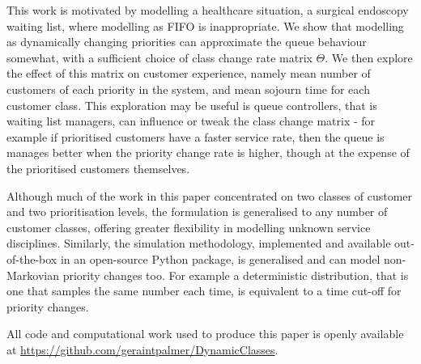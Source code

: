 \documentclass{article}
\begin{document}
This work is motivated by modelling a healthcare situation, a surgical endoscopy
waiting list, where modelling as FIFO is inappropriate. We show that modelling
as dynamically changing priorities can approximate the queue behaviour somewhat,
with a sufficient choice of class change rate matrix $\Theta$. We then explore
the effect of this matrix on customer experience, namely mean number of
customers of each priority in the system, and mean sojourn time for each
customer class. This exploration may be useful is queue controllers, that is
waiting list managers, can influence or tweak the class change matrix - for
example if prioritised customers have a faster service rate, then the queue is
manages better when the priority change rate is higher, though at the expense of
the prioritised customers themselves.

Although much of the work in this paper concentrated on two classes of customer
and two prioritisation levels, the formulation is generalised to any number of
customer classes, offering greater flexibility in modelling unknown service
disciplines. Similarly, the simulation methodology, implemented and available
out-of-the-box in an open-source Python package, is generalised and can model
non-Markovian priority changes too. For example a deterministic distribution,
that is one that samples the same number each time, is equivalent to a time
cut-off for priority changes.

All code and computational work used to produce this paper is openly available
at \url{https://github.com/geraintpalmer/DynamicClasses}.



\end{document}
